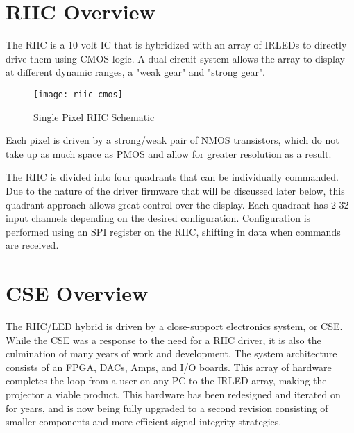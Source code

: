 \section{RIIC Overview}
The RIIC is a 10 volt IC that is hybridized with an array of IRLEDs to directly drive them using CMOS logic. A dual-circuit system allows the array to display at different dynamic ranges, a "weak gear" and "strong gear".
\begin {figure} [h]
\texttt{[image: riic\_cmos]}
\centering
\caption {Single Pixel RIIC Schematic \cite{miguel}}
\centering
\end {figure}
Each pixel is driven by a strong/weak pair of NMOS transistors, which do not take up as much space as PMOS and allow for greater resolution as a result. \par
The RIIC is divided into four quadrants that can be individually commanded. Due to the nature of the driver firmware that will be discussed later below, this quadrant approach allows great control over the display. \cite{miguel} Each quadrant has 2-32 input channels depending on the desired configuration. Configuration is performed using an SPI register on the RIIC, shifting in data when commands are received. \par

\section{CSE Overview}
The RIIC/LED hybrid is driven by a close-support electronics system, or CSE. While the CSE was a response to the need for a RIIC driver, it is also the culmination of many years of work and development. The system architecture consists of an FPGA, DACs, Amps, and I/O boards. This array of hardware completes the loop from a user on any PC to the IRLED array, making the projector a viable product. This hardware has been redesigned and iterated on for years, and is now being fully upgraded to a second revision consisting of smaller components and more efficient signal integrity strategies.

